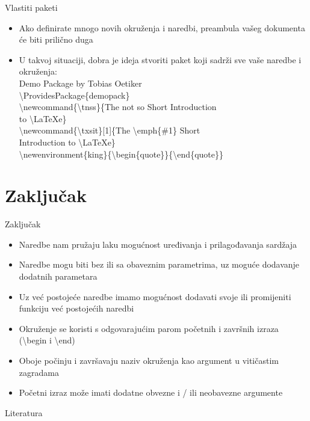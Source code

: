 \documentclass{beamer}
\begin{document}
\begin{frame}[t]{Vlastiti paketi}

\begin{itemize}
	\item Ako definirate mnogo novih okruženja i naredbi, preambula
vašeg dokumenta će biti prilično duga
	\item U takvoj situaciji, dobra je ideja
stvoriti paket koji sadrži sve vaše naredbe i okruženja:\\
 Demo Package by Tobias Oetiker\\
\textbackslash ProvidesPackage\{demopack\}\\
\textbackslash newcommand\{\textbackslash tnss\}\{The not so Short Introduction\\
to \textbackslash LaTeXe\}\\
\textbackslash newcommand\{\textbackslash txsit\}[1]\{The \textbackslash emph\{\#1\} Short\\
Introduction to \textbackslash LaTeXe\}\\
\textbackslash newenvironment\{king\}\{\textbackslash begin\{quote\}\}\{\textbackslash end\{quote\}\}\\
\end{itemize}
\end{frame}


\section{Zaključak}

\begin{frame}[t]{Zaključak}
\begin{itemize}
	\item Naredbe nam pružaju laku mogućnost uređivanja i prilagođavanja sardžaja
	\item Naredbe mogu biti bez ili sa obaveznim parametrima, uz moguće dodavanje dodatnih parametara
	\item Uz već postojeće naredbe imamo mogućnost dodavati svoje ili promijeniti funkciju već postojećih naredbi
	\item Okruženje se koristi s odgovarajućim parom početnih i završnih izraza (\textbackslash begin i \textbackslash end)
	\item Oboje počinju i završavaju naziv okruženja kao argument u vitičastim zagradama
	\item Početni izraz može imati dodatne obvezne i / ili neobavezne argumente
\end{itemize}
\end{frame}

\nocite{*}
\begin{frame}[t]{Literatura}


\end{frame}
\end{document}
